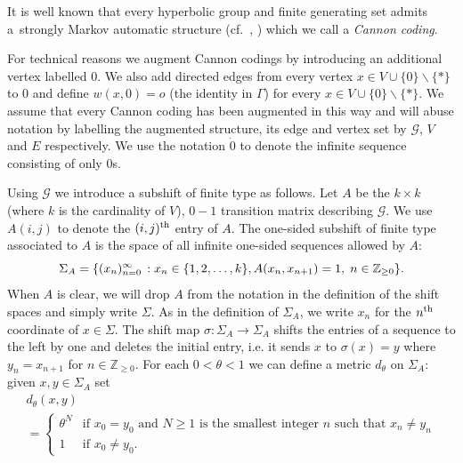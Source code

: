 \documentclass[10pt]{amsart}
\theoremstyle{definition}\newtheorem{defi}[theo]{Definition}\newtheorem{rema}[theo]{Remark}\newtheorem{exam}[theo]{Example}\newtheorem{exem}[theo]{Example}\newtheorem{nota}[theo]{Notation}
\renewcommand{\SS}{\Sigma}
\newcommand{\Gc}{\mathcal{G}}
\newcommand{\Z}{\mathbb{Z}}
\let\originalleft\left
\let\originalright\right
\renewcommand{\left}{\mathopen{}\mathclose\bgroup\originalleft}
\renewcommand{\right}{\aftergroup\egroup\originalright}
\newcounter{setofcase}
\newcounter{case}[setofcase]
\theoremstyle{plain}
\begin{document}
It is well known that every hyperbolic group and finite generating set admits a~strongly Markov automatic structure (cf.~\cite{GhysdelaHarpe}, \cite[Section~3.2]{Calegari}) which we call a \emph{Cannon coding}.

For technical reasons we augment Cannon codings by introducing an additional vertex labelled $0$. We also add directed edges from every vertex $x \in V \cup \{0\} \backslash \{\ast\}$ to $0$ and define $w(x,0) = o$ (the identity in $\Gamma$) for every $x \in V \cup \{0\} \backslash \{\ast\}$. We assume that every Cannon coding has been augmented in this way and will abuse notation by labelling the augmented structure, its edge and vertex set by $\Gc$, $V$ and $E$ respectively. We use the notation $\dot{0}$ to denote the infinite sequence consisting of only $0$s.

Using $\Gc$ we introduce a subshift of finite type as follows. Let $A$ be the $k \times k$ (where $k$ is the cardinality of $V$), $0-1$ transition matrix describing $\Gc$. We use $A(i,j)$ to denote the $(i,j)^{\rm th}$ entry of $A$. The one-sided subshift of finite type associated to $A$ is the space of all infinite one-sided sequences allowed by $A$:
\[
\Sigma_A = \left\{(x_n)_{n=0}^{\infty} \,: x_n \in \{1,2,\dots,k\}, A(x_n,x_{n+1})=1, \; n \in \Z_{\ge 0}\right\}.
\]
When $A$ is clear, we will drop $A$ from the notation in the definition of the shift spaces and simply write $\SS$. As in the definition of $\Sigma_A$, we write $x_n$ for the $n^{\rm th}$ coordinate of $x \in \Sigma$. The shift map $\sigma: \Sigma_A \rightarrow \Sigma_A$ shifts the entries of a sequence to the left by one and deletes the initial entry, i.e. it sends $x$ to $\sigma(x) = y$ where $y_n=x_{n+1}$ for $n \in \Z_{\ge 0}$. For each $0<\theta <1$ we can define a metric $d_\theta$ on $\Sigma_A$: given $x,y \in
\Sigma_A$ set
\begin{multline}
d_\theta(x,y)\\
=\begin{cases}
\theta^{N} &\text{if $x_0 = y_0$ and $N \ge 1$ is the smallest integer $n$ such that $x_n \neq y_n$} \\
1 &\text{if $x_0 \neq y_0$}.
\end{cases}
\end{multline}
\end{document}
